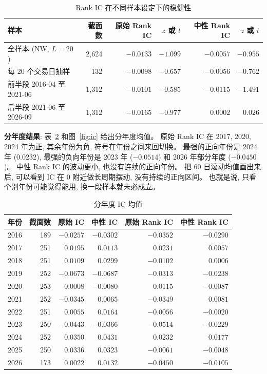 \documentclass[11pt,a4paper]{article}
\begin{document}
\begin{table}[H]
\centering
\caption{Rank IC 在不同样本设定下的稳健性}
\label{tab:robust}
\small
\begin{tabular}{lrrrrr}
\toprule
样本 & 截面数 & 原始 Rank IC & $z$ 或 $t$ & 中性 Rank IC & $z$ 或 $t$ \\
\midrule
全样本 (NW, $L=20$) & 2{,}624 & $-0.0133$ & $-1.099$ & $-0.0057$ & $-0.955$ \\
每 20 个交易日抽样 & 132 & $-0.0098$ & $-0.657$ & $-0.0056$ & $-0.762$ \\
前半段 2016-04 至 2021-06 & 1{,}312 & $-0.0101$ & $-0.585$ & $-0.0115$ & $-1.491$ \\
后半段 2021-06 至 2026-09 & 1{,}312 & $-0.0165$ & $-0.977$ & $0.0002$ & $0.026$ \\
\bottomrule
\end{tabular}
\end{table}

\textbf{分年度结果}:
表~\ref{tab:yearly} 和图~\ref{fig:ic} 给出分年度均值。
原始 Rank IC 在 2017, 2020, 2024 年为正, 其余年份为负, 符号在年份之间来回切换。
最强的正向年份是 2024 年 ($0.0232$), 最强的负向年份是 2023 年 ($-0.0514$) 和 2026 年部分年度 ($-0.0450$)。
中性 Rank IC 的波动更小, 也没有连续的正向年份。
把 60 日滚动均值画出来后, 可以看到 IC 在 0 附近做长周期摆动, 没有持续的正向区间。
也就是说, 只看个别年份可能觉得能用, 换一段样本就未必成立。

\begin{table}[H]
\centering
\caption{分年度 IC 均值}
\label{tab:yearly}
\begin{tabular}{rrrrrr}
\toprule
年份 & 截面数 & 原始 IC & 中性 IC & 原始 Rank IC & 中性 Rank IC \\
\midrule
2016 & 189 & $-0.0257$ & $-0.0302$ & $-0.0352$ & $-0.0290$ \\
2017 & 251 & $0.0195$ & $0.0113$ & $0.0231$ & $0.0057$ \\
2018 & 251 & $0.0109$ & $0.0299$ & $-0.0102$ & $0.0006$ \\
2019 & 252 & $-0.0673$ & $-0.0687$ & $-0.0313$ & $-0.0238$ \\
2020 & 253 & $0.0008$ & $-0.0080$ & $0.0115$ & $-0.0087$ \\
2021 & 252 & $-0.0345$ & $0.0065$ & $-0.0349$ & $0.0081$ \\
2022 & 251 & $0.0055$ & $0.0164$ & $-0.0056$ & $-0.0020$ \\
2023 & 250 & $-0.0443$ & $-0.0366$ & $-0.0514$ & $-0.0229$ \\
2024 & 252 & $0.0350$ & $0.0431$ & $0.0232$ & $0.0177$ \\
2025 & 250 & $0.0336$ & $0.0323$ & $-0.0061$ & $-0.0048$ \\
2026 & 173 & $0.0022$ & $0.0132$ & $-0.0450$ & $-0.0105$ \\
\bottomrule
\end{tabular}
\end{table}
\end{document}
